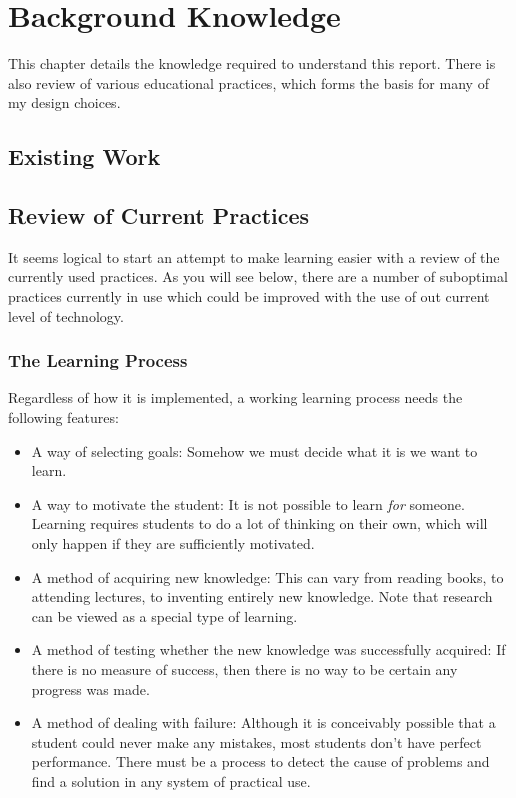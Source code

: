 \chapter{Background Knowledge}
\label{chapter:background}
  This chapter details the knowledge required to understand this report. There is also review of various educational practices, which forms the basis for many of my design choices.

  \section{Existing Work}
  \section{Review of Current Practices}
    It seems logical to start an attempt to make learning easier with a review of the currently used practices. As you will see below, there are a number of suboptimal practices currently in use which could be improved with the use of out current level of technology.
    

    \subsection{The Learning Process}
      Regardless of how it is implemented, a working learning process needs the following features:

      \begin{itemize}
        \item A way of selecting goals: Somehow we must decide what it is we want to learn.

        \item A way to motivate the student: It is not possible to learn \emph{for} someone. Learning requires students to do a lot of thinking on their own, which will only happen if they are sufficiently motivated.

        \item A method of acquiring new knowledge: This can vary from reading books, to attending lectures, to inventing entirely new knowledge. Note that research can be viewed as a special type of learning.

        \item A method of testing whether the new knowledge was successfully acquired: If there is no measure of success, then there is no way to be certain any progress was made.

        \item A method of dealing with failure: Although it is conceivably possible that a student could never make any mistakes, most students don't have perfect performance. There must be a process to detect the cause of problems and find a solution in any system of practical use.
      \end{itemize}

